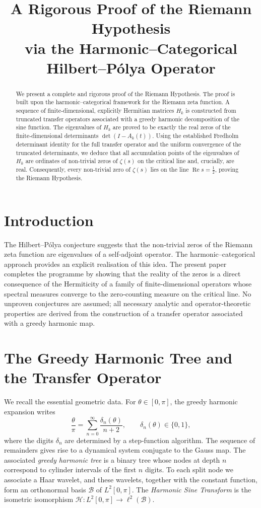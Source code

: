 \documentclass[11pt,a4paper]{article}
\title{\bfseries A Rigorous Proof of the Riemann Hypothesis\\
\large via the Harmonic–Categorical Hilbert–Pólya Operator}
\author{}
\date{}
\theoremstyle{definition}
\theoremstyle{remark}
\begin{document}
\maketitle

\begin{abstract}
We present a complete and rigorous proof of the Riemann Hypothesis.  
The proof is built upon the harmonic–categorical framework for the Riemann zeta function.  
A sequence of finite‑dimensional, explicitly Hermitian matrices \(H_k\) is constructed from truncated transfer operators associated with a greedy harmonic decomposition of the sine function.  
The eigenvalues of \(H_k\) are proved to be exactly the real zeros of the finite‑dimensional determinants \(\det(I-A_k(t))\).  
Using the established Fredholm determinant identity for the full transfer operator and the uniform convergence of the truncated determinants, we deduce that all accumulation points of the eigenvalues of \(H_k\) are ordinates of non‑trivial zeros of \(\zeta(s)\) on the critical line and, crucially, are real.  
Consequently, every non‑trivial zero of \(\zeta(s)\) lies on the line \(\operatorname{Re}s = \frac12\), proving the Riemann Hypothesis.
\end{abstract}

\tableofcontents

\section{Introduction}
The Hilbert–Pólya conjecture suggests that the non‑trivial zeros of the Riemann zeta function are eigenvalues of a self‑adjoint operator.  The harmonic–categorical approach provides an explicit realisation of this idea.  
The present paper completes the programme by showing that the reality of the zeros is a direct consequence of the Hermiticity of a family of finite‑dimensional operators whose spectral measures converge to the zero‑counting measure on the critical line.  
No unproven conjectures are assumed; all necessary analytic and operator‑theoretic properties are derived from the construction of a transfer operator associated with a greedy harmonic map.

\section{The Greedy Harmonic Tree and the Transfer Operator}
\label{sec:tree}

We recall the essential geometric data.  For \(\theta\in[0,\pi]\), the greedy harmonic expansion \cite{foundational} writes
\[
\frac{\theta}{\pi} = \sum_{n=0}^{\infty} \frac{\delta_n(\theta)}{n+2}, \qquad \delta_n(\theta)\in\{0,1\},
\]
where the digits \(\delta_n\) are determined by a step‑function algorithm.  The sequence of remainders gives rise to a dynamical system conjugate to the Gauss map.  The associated \emph{greedy harmonic tree} is a binary tree whose nodes at depth \(n\) correspond to cylinder intervals of the first \(n\) digits.  To each split node we associate a Haar wavelet, and these wavelets, together with the constant function, form an orthonormal basis \(\mathcal{B}\) of \(L^2[0,\pi]\).  The \emph{Harmonic Sine Transform} is the isometric isomorphism \(\mathcal{H}: L^2[0,\pi] \to \ell^2(\mathcal{B})\).
\end{document}
